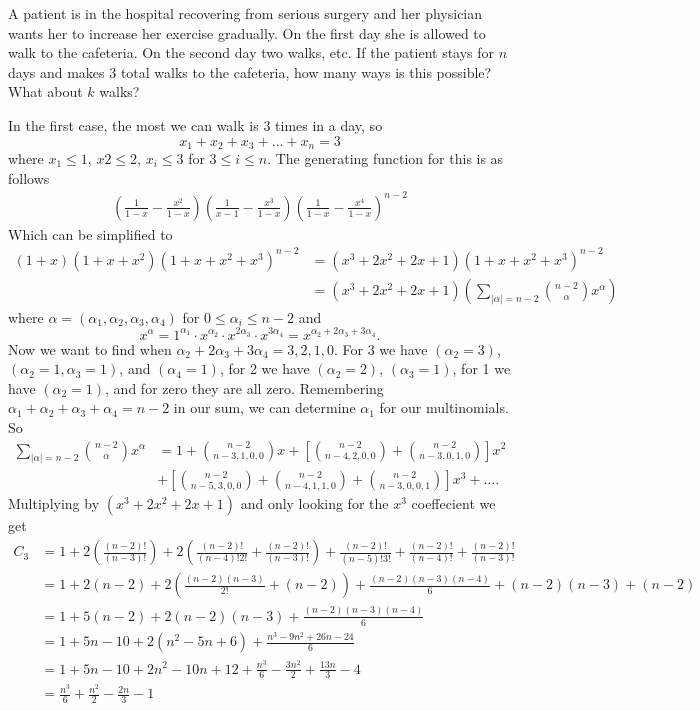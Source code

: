 \documentclass[12pt]{article}
\newenvironment{problem}[2][Problem]{\begin{trivlist}
\item[\hskip \labelsep {\bfseries #1} \hskip \labelsep {\bfseries #2.}]}{\end{trivlist}}
\begin{document}
\begin{problem}{9}
	A patient is in the hospital recovering from serious surgery and her physician wants her to increase her exercise gradually. On the first day she is allowed to walk to the cafeteria. On the second day two walks, etc. If the patient stays for $n$ days and makes $3$ total walks to the cafeteria, how many ways is this possible? What about $k$ walks?
\end{problem}
In the first case, the most we can walk is 3 times in a day, so
\[
	x_1 + x_2 + x_3 + \ldots + x_n = 3
\]
where $x_1 \le 1$, $x2 \le 2$, $x_i \le 3$ for $3 \le i \le n$. The generating function for this is as follows
\begin{align*}
	\left(\frac{1}{1-x} - \frac{x^2}{1 - x}\right)\left(\frac{1}{x-1} - \frac{x^3}{1 - x}\right)\left(\frac{1}{1-x}-\frac{x^4}{1-x}\right)^{n-2}
\end{align*}
Which can be simplified to
\begin{align*}
	(1 + x)(1 + x + x^2)(1 + x + x^2 + x^3)^{n-2} &= (x^3 + 2x^2 + 2x + 1)(1 + x + x^2 + x^3)^{n-2} \\
						      &= (x^3 + 2x^2 + 2x + 1)\left(\sum_{|\alpha| = n-2} \binom{n-2}{\alpha}x^{\alpha}\right)
\end{align*}
where $\alpha = (\alpha_1,\alpha_2,\alpha_3,\alpha_4)$ for $0 \le \alpha_i \le n-2$ and
\[
	x^{\alpha} = 1^{\alpha_1}\cdot x^{\alpha_2}\cdot x^{2\alpha_3} \cdot x^{3\alpha_4} = x^{\alpha_2 + 2\alpha_3 + 3\alpha_4}.
\]
Now we want to find when $\alpha_2 + 2\alpha_3 + 3\alpha_4 = 3,2,1,0$. For 3 we have $(\alpha_2 = 3)$, $(\alpha_2 = 1, \alpha_3 = 1)$, and $(\alpha_4 = 1)$, for 2 we have $(\alpha_2 = 2)$, $(\alpha_3 = 1)$, for 1 we have $(\alpha_2 = 1)$, and for zero they are all zero. Remembering $\alpha_1 + \alpha_2 + \alpha_3 + \alpha_4 = n - 2$ in our sum, we can determine $\alpha_1$ for our multinomials. So
\begin{align*}
	\sum_{|\alpha| = n-2} \binom{n-2}{\alpha}x^{\alpha} &= 1 + \binom{n-2}{n-3,1,0,0}x + \left[\binom{n-2}{n-4,2,0,0} + \binom{n-2}{n-3,0,1,0}\right]x^2 \\
							    &+ \left[\binom{n-2}{n-5,3,0,0} + \binom{n-2}{n-4,1,1,0} + \binom{n-2}{n-3,0,0,1}\right]x^3 + \ldots.
\end{align*}
Multiplying by $(x^3 + 2x^2 + 2x + 1)$ and only looking for the $x^3$ coeffecient we get
\begin{align*}
	C_3 &= 1 + 2\left(\frac{(n-2)!}{(n-3)!}\right) + 2\left(\frac{(n-2)!}{(n-4)!2!} + \frac{(n-2)!}{(n-3)!}\right) + \frac{(n-2)!}{(n-5)!3!} + \frac{(n-2)!}{(n-4)!} + \frac{(n-2)!}{(n-3)!} \\
	    &= 1 + 2(n-2) + 2\left(\frac{(n-2)(n-3)}{2!}+(n-2)\right) + \frac{(n-2)(n-3)(n-4)}{6} + (n-2)(n-3) + (n-2) \\
	    &= 1 + 5(n-2) + 2(n-2)(n-3) + \frac{(n-2)(n-3)(n-4)}{6} \\
	    &= 1 + 5n - 10 + 2(n^2 - 5n + 6) + \frac{n^3 - 9n^2 + 26n - 24}{6} \\
	    &= 1 + 5n - 10 + 2n^2 - 10n + 12 + \frac{n^3}{6} - \frac{3n^2}{2} + \frac{13n}{3} - 4 \\
	    &= \frac{n^3}{6} + \frac{n^2}{2} - \frac{2n}{3} - 1
\end{align*}
\end{document}
